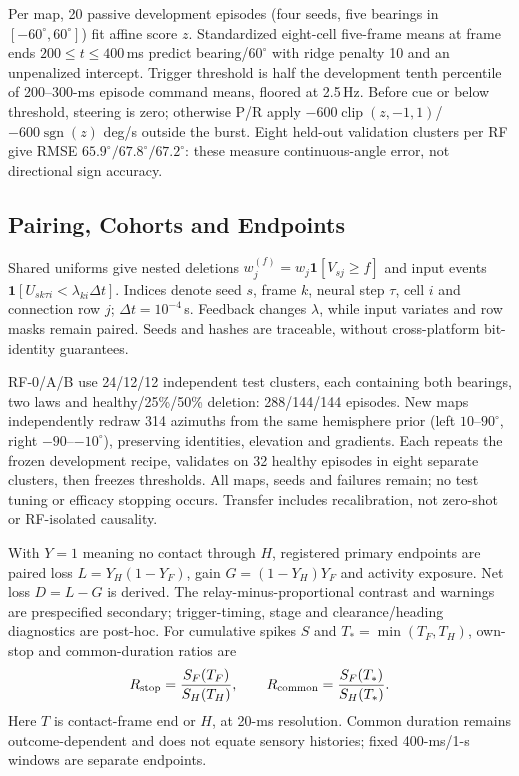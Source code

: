 Per map, 20 passive development episodes (four seeds, five bearings in $[-60^\circ,60^\circ]$) fit affine score $z$. Standardized eight-cell five-frame means at frame ends $200\le t\le400$\,ms predict bearing/$60^\circ$ with ridge penalty 10 and an unpenalized intercept. Trigger threshold is half the development tenth percentile of 200--300-ms episode command means, floored at 2.5\,Hz. Before cue or below threshold, steering is zero; otherwise P/R apply $-600\operatorname{clip}(z,-1,1)$/$-600\operatorname{sgn}(z)$ deg/s outside the burst. Eight held-out validation clusters per RF give RMSE $65.9^\circ/67.8^\circ/67.2^\circ$: these measure continuous-angle error, not directional sign accuracy.

\subsection{Pairing, Cohorts and Endpoints}
Shared uniforms give nested deletions $w_j^{(f)}=w_j\mathbf1[V_{sj}\geq f]$ and input events $\mathbf1[U_{sk\tau i}<\lambda_{ki}\Delta t]$. Indices denote seed $s$, frame $k$, neural step $\tau$, cell $i$ and connection row $j$; $\Delta t=10^{-4}$\,s. Feedback changes $\lambda$, while input variates and row masks remain paired. Seeds and hashes are traceable, without cross-platform bit-identity guarantees.

RF-0/A/B use 24/12/12 independent test clusters, each containing both bearings, two laws and healthy/25\%/50\% deletion: 288/144/144 episodes. New maps independently redraw 314 azimuths from the same hemisphere prior (left $10$--$90^\circ$, right $-90$--$-10^\circ$), preserving identities, elevation and gradients. Each repeats the frozen development recipe, validates on 32 healthy episodes in eight separate clusters, then freezes thresholds. All maps, seeds and failures remain; no test tuning or efficacy stopping occurs. Transfer includes recalibration, not zero-shot or RF-isolated causality.

With $Y=1$ meaning no contact through $H$, registered primary endpoints are paired loss $L=Y_H(1-Y_F)$, gain $G=(1-Y_H)Y_F$ and activity exposure. Net loss $D=L-G$ is derived. The relay-minus-proportional contrast and warnings are prespecified secondary; trigger-timing, stage and clearance/heading diagnostics are post-hoc. For cumulative spikes $S$ and $T_*=\min(T_F,T_H)$, own-stop and common-duration ratios are
\begin{equation}
R_{\rm stop}=\frac{S_F(T_F)}{S_H(T_H)},\qquad
R_{\rm common}=\frac{S_F(T_*)}{S_H(T_*)}.
\end{equation}
Here $T$ is contact-frame end or $H$, at 20-ms resolution. Common duration remains outcome-dependent and does not equate sensory histories; fixed 400-ms/1-s windows are separate endpoints.


